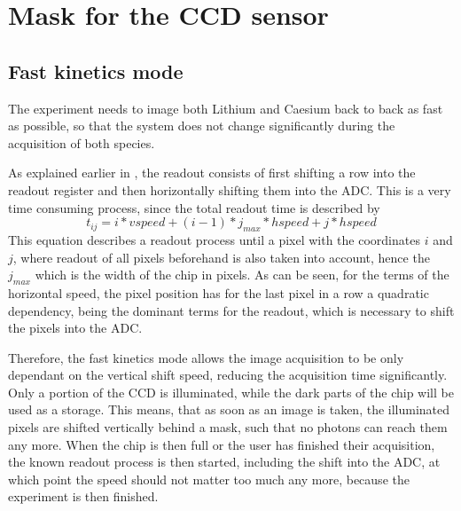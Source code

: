 \newpage
\section{Mask for the CCD sensor}
\subsection{Fast kinetics mode}
\label{ch:fast_kin}
The experiment needs to image both Lithium and Caesium back to back as fast as possible, so that the system does not change significantly during the acquisition of both species.

As explained earlier in , the readout consists of first shifting a row into the readout register and then horizontally shifting them into the ADC. This is a very time consuming process, since the total readout time is described by
\begin{equation}
t_{ij} = i*vspeed + (i-1)*j_{max}*hspeed+j*hspeed
\end{equation}
This equation describes a readout process until a pixel with the coordinates $i$ and $j$, where readout of all pixels beforehand is also taken into account, hence the $j_{max}$ which is the width of the chip in pixels.
As can be seen, for the terms of the horizontal speed, the pixel position has for the last pixel in a row a quadratic dependency, being the dominant terms for the readout, which is necessary to shift the pixels into the ADC.

Therefore, the fast kinetics mode allows the image acquisition to be only dependant on the vertical shift speed, reducing the acquisition time significantly. Only a portion of the CCD is illuminated, while the dark parts of the chip will be used as a storage. This means, that as soon as an image is taken, the illuminated pixels are shifted vertically behind a mask, such that no photons can reach them any more. When the chip is then full or the user has finished their acquisition, the known readout process is then started, including the shift into the ADC, at which point the speed should not matter too much any more, because the experiment is then finished.

